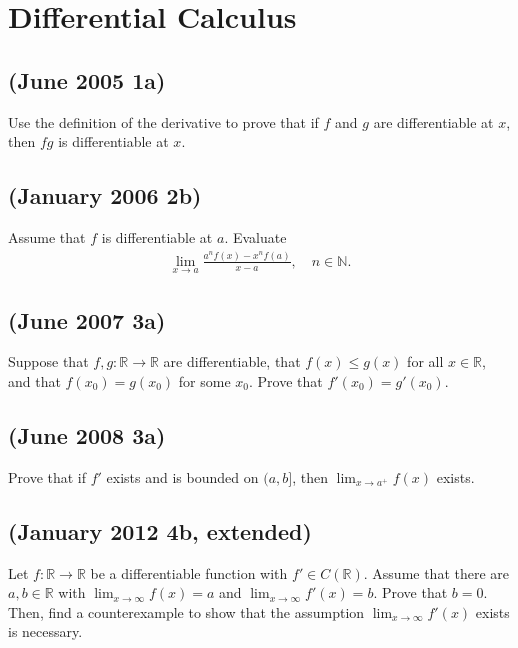 \hypertarget{differential-calculus}{%
\section{Differential Calculus}\label{differential-calculus}}

\hypertarget{june-2005-1a}{%
\subsection{(June 2005 1a)}\label{june-2005-1a}}

Use the definition of the derivative to prove that if \(f\) and \(g\)
are differentiable at \(x\), then \(fg\) is differentiable at \(x\).

\hypertarget{january-2006-2b}{%
\subsection{(January 2006 2b)}\label{january-2006-2b}}

Assume that \(f\) is differentiable at \(a\). Evaluate
\begin{align*}\lim_{x\to a}\frac{a^nf(x)-x^nf(a)}{x-a},\quad n\in\mathbb{N}.\end{align*}

\hypertarget{june-2007-3a}{%
\subsection{(June 2007 3a)}\label{june-2007-3a}}

Suppose that \(f,g:\mathbb{R}\to\mathbb{R}\) are differentiable, that
\(f(x)\leq g(x)\) for all \(x\in\mathbb{R}\), and that \(f(x_0)=g(x_0)\)
for some \(x_0\). Prove that \(f'(x_0)=g'(x_0)\).

\hypertarget{june-2008-3a}{%
\subsection{(June 2008 3a)}\label{june-2008-3a}}

Prove that if \(f'\) exists and is bounded on \((a,b]\), then
\(\lim_{x\to a^+}f(x)\) exists.

\hypertarget{january-2012-4b-extended}{%
\subsection{(January 2012 4b,
extended)}\label{january-2012-4b-extended}}

Let \(f:\mathbb{R}\to\mathbb{R}\) be a differentiable function with
\(f'\in C(\mathbb{R})\). Assume that there are \(a,b\in\mathbb{R}\) with
\(\lim_{x\to\infty}f(x)=a\) and \(\lim_{x\to\infty}f'(x)=b\). Prove that
\(b=0\). Then, find a counterexample to show that the assumption
\(\lim_{x\to\infty}f'(x)\) exists is necessary.

